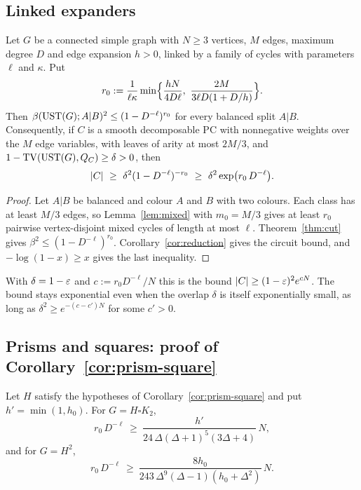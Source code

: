 \subsection{Linked expanders}

\begin{theorem}\label{thm:general}
Let $G$ be a connected simple graph with $N\ge3$ vertices, $M$ edges, maximum degree $D$ and edge expansion $h>0$, linked by a family of cycles with parameters $\ell$ and $\kappa$. Put
\[
  r_0:=\frac1{\ell\kappa}\min\Bigl\{\frac{hN}{4D\ell},\ \frac{2M}{3\ell D(1+D/h)}\Bigr\}.
\]
Then $\beta(\mathrm{UST}(G);A|B)^2\le(1-D^{-\ell})^{r_0}$ for every balanced split $A|B$. Consequently, if $C$ is a smooth decomposable PC with nonnegative weights over the $M$ edge variables, with leaves of arity at most $2M/3$, and $1-\mathrm{TV}(\mathrm{UST}(G),Q_C)\ge\delta>0$, then
\[
  \abs C\ \ge\ \delta^2(1-D^{-\ell})^{-r_0}\ \ge\ \delta^2\exp\bigl(r_0\,D^{-\ell}\bigr).
\]
\end{theorem}

\begin{proof}
Let $A|B$ be balanced and colour $A$ and $B$ with two colours. Each class has at least $M/3$ edges, so Lemma~\ref{lem:mixed} with $m_0=M/3$ gives at least $r_0$ pairwise vertex-disjoint mixed cycles of length at most $\ell$. Theorem~\ref{thm:cut} gives $\beta^2\le(1-D^{-\ell})^{r_0}$. Corollary~\ref{cor:reduction} gives the circuit bound, and $-\log(1-x)\ge x$ gives the last inequality.
\end{proof}

With $\delta=1-\varepsilon$ and $c:=r_0D^{-\ell}/N$ this is the bound $\lvert C\rvert\ge(1-\varepsilon)^2e^{cN}$. The bound stays exponential even when the overlap $\delta$ is itself exponentially small, as long as $\delta^2\ge e^{-(c-c')N}$ for some $c'>0$.

\subsection{Prisms and squares: proof of Corollary~\ref{cor:prism-square}}

\begin{corollary}\label{cor:constants}
Let $H$ satisfy the hypotheses of Corollary~\ref{cor:prism-square} and put $h'=\min(1,h_0)$. For $G=H\square K_2$,
\[
  r_0\,D^{-\ell}\ \ge\ \frac{h'}{24\,\Delta(\Delta+1)^5(3\Delta+4)}\,N ,
\]
and for $G=H^2$,
\[
  r_0\,D^{-\ell}\ \ge\ \frac{8h_0}{243\,\Delta^{9}(\Delta-1)(h_0+\Delta^2)}\,N .
\]
\end{corollary}

